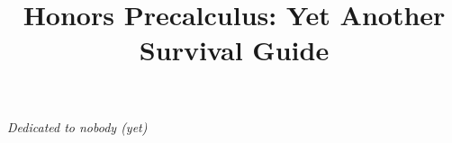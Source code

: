 \documentclass[11pt,twoside=semi,openright,numbers=noenddot]{scrbook}
\begin{document}
\title{Honors Precalculus: Yet Another Survival Guide}
\maketitle

\newpage{}
\vspace*{\fill}
\begingroup
\centering
\begin{center}
    \textit{Dedicated to nobody (yet)}
\end{center}
\endgroup
\vspace*{\fill}

\tableofcontents















\appendix{}


\end{document}
